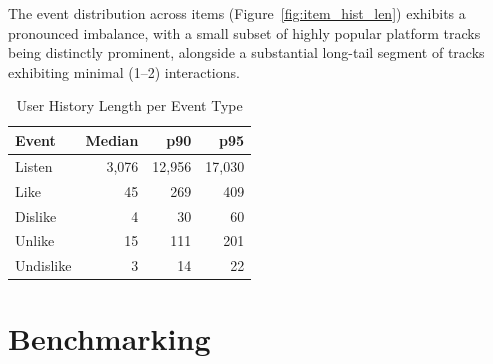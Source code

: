 \documentclass[sigconf,authorversion,nonacm]{acmart}
\begin{document}
The event distribution across items (Figure~\ref{fig:item_hist_len}) exhibits a pronounced imbalance, with a small subset of highly popular platform tracks being distinctly prominent, alongside a substantial long-tail segment of tracks exhibiting minimal (1–2) interactions.

\begin{table}
  \caption{User History Length per Event Type}
  \label{tab:event_history_len}
  \begin{tabular}{lrrr}
    \toprule
    Event & Median & p90 & p95 \\
    \midrule
    Listen & 3,076 & 12,956 & 17,030 \\
    Like & 45 & 269 & 409 \\
    Dislike & 4 & 30 & 60 \\
    Unlike & 15 & 111 & 201\\
    Undislike & 3 & 14 & 22 \\
    \bottomrule
  \end{tabular}
\end{table}

\section{Benchmarking}\label{sec:bench}
\end{document}
